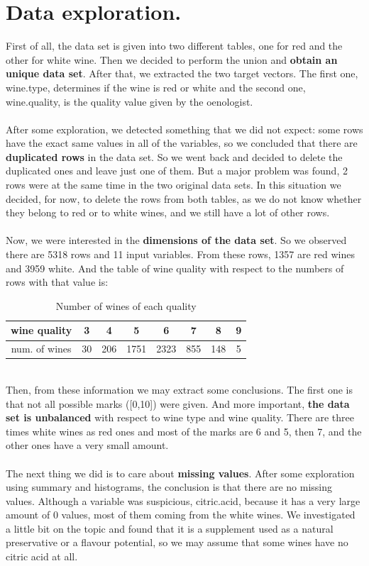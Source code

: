 \documentclass[10pt]{article}
\begin{document}
\section{Data exploration.}
First of all, the data set is given into two different tables, one for red and the other for white wine. Then we decided to perform the union and \textbf{obtain an unique data set}. After that, we extracted the two target vectors. The first one, wine.type, determines if the wine is red or white and the second one, wine.quality, is the quality value given by the oenologist. \\ \ \\
After some exploration, we detected something that we did not expect: some rows have the exact same values in all of the variables, so we concluded that there are \textbf{duplicated rows} in the data set. So we went back and decided to delete the duplicated ones and leave just one of them. But a major problem was found, 2 rows were at the same time in the two original data sets. In this situation we decided, for now, to delete the rows from both tables, as we do not know whether they belong to red or to white wines, and we still have a lot of other rows. \\ \ \\
Now, we were interested in the \textbf{dimensions of the data set}. So we observed there are 5318 rows and 11 input variables. From these rows, 1357 are red wines and 3959 white. And the table of wine quality with respect to the numbers of rows with that value is:
\begin{table}[H]
\caption{Number of wines of each quality}
\centering
\begin{tabular}{|c|c|c|c|c|c|c|c|}
\hline
wine quality  & 3  & 4   & 5    & 6    & 7    & 8   & 9 \\ \hline
num. of wines & 30 & 206 & 1751 & 2323 & 855  & 148 & 5 \\ \hline
\end{tabular}
\end{table}
\ \\
Then, from these information we may extract some conclusions. The first one is that not all possible marks ([0,10]) were given. And more important, \textbf{the data set is unbalanced} with respect to wine type and wine quality. There are three times white wines as red ones and most of the marks are 6 and 5, then 7, and the other ones have a very small amount. \\ \ \\
The next thing we did is to care about \textbf{missing values}. After some exploration using summary and histograms, the conclusion is that there are no missing values. Although a variable was suspicious, citric.acid, because it has a very large amount of 0 values, most of them coming from the white wines. We investigated a little bit on the topic and found that it is a supplement used as a natural preservative or a flavour potential, so we may assume that some wines have no citric acid at all. \\ \ \\
\end{document}
